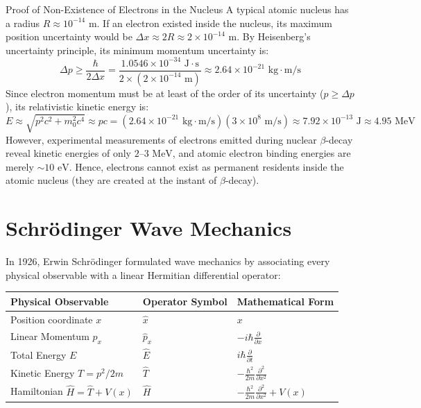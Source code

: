 \begin{derivbox}{Proof of Non-Existence of Electrons in the Nucleus}
A typical atomic nucleus has a radius $R \approx 10^{-14}\text{ m}$. If an electron existed inside the nucleus, its maximum position uncertainty would be $\Delta x \approx 2R \approx 2 \times 10^{-14}\text{ m}$.
By Heisenberg's uncertainty principle, its minimum momentum uncertainty is:
\begin{equation}
\Delta p \ge \frac{\hbar}{2\Delta x} = \frac{1.0546 \times 10^{-34}\text{ J}\cdot\text{s}}{2 \times (2 \times 10^{-14}\text{ m})} \approx 2.64 \times 10^{-21}\text{ kg}\cdot\text{m/s}
\end{equation}
Since electron momentum must be at least of the order of its uncertainty ($p \ge \Delta p$), its relativistic kinetic energy is:
\begin{equation}
E \approx \sqrt{p^2 c^2 + m_0^2 c^4} \approx p c = (2.64 \times 10^{-21}\text{ kg}\cdot\text{m/s})(3 \times 10^8\text{ m/s}) \approx 7.92 \times 10^{-13}\text{ J} \approx 4.95\text{ MeV}
\end{equation}
However, experimental measurements of electrons emitted during nuclear $\beta$-decay reveal kinetic energies of only $2\text{--}3\text{ MeV}$, and atomic electron binding energies are merely $\sim 10\text{ eV}$. Hence, electrons cannot exist as permanent residents inside the atomic nucleus (they are created at the instant of $\beta$-decay).
\end{derivbox}

\section{Schrödinger Wave Mechanics}
In 1926, Erwin Schrödinger formulated wave mechanics by associating every physical observable with a linear Hermitian differential operator:
\begin{center}
\begin{tabularx}{0.85\textwidth}{l l l}
\toprule
\textbf{Physical Observable} & \textbf{Operator Symbol} & \textbf{Mathematical Form} \\
\midrule
Position coordinate $x$ & $\hat{x}$ & $x$ \\
Linear Momentum $p_x$ & $\hat{p}_x$ & $-i\hbar\frac{\partial}{\partial x}$ \\
Total Energy $E$ & $\hat{E}$ & $i\hbar\frac{\partial}{\partial t}$ \\
Kinetic Energy $T = p^2/2m$ & $\hat{T}$ & $-\frac{\hbar^2}{2m}\frac{\partial^2}{\partial x^2}$ \\
Hamiltonian $\hat{H} = \hat{T} + V(x)$ & $\hat{H}$ & $-\frac{\hbar^2}{2m}\frac{\partial^2}{\partial x^2} + V(x)$ \\
\bottomrule
\end{tabularx}
\end{center}

